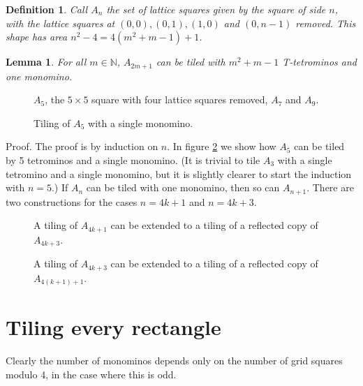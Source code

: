 \documentclass{article}
\theoremstyle{plain}
\newtheorem{lemma}[theorem]{Lemma}
\newtheorem{definition}[theorem]{Definition}
\begin{document}
\begin{definition}
Call $A_n$ the set of lattice squares given by the square of side $n$, with the lattice squares at $(0, 0), (0,1), (1, 0)$ and $(0, n-1)$ removed.
This shape has area $n^2 - 4 = 4(m^2 + m - 1) + 1$.
\end{definition}

\begin{lemma}
For all $m \in \mathbb{N}$, $A_{2m+1}$ can be tiled with $m^2 + m - 1$ T-tetrominos and one monomino.
\end{lemma}

\begin{figure}

\caption{$A_5$, the $5 \times 5$ square with four lattice squares removed, $A_7$ and $A_9$.}
\label{cropped}
\end{figure}

\begin{figure}

\caption{Tiling of $A_5$ with a single monomino.}
\label{five}
\end{figure}

{\sc Proof.}
The proof is by induction on $n$. In figure \ref{five} we show how $A_5$ can be tiled by 5 tetrominos and a single monomino. (It is trivial to tile $A_3$ with a single tetromino and a single monomino, but it is slightly clearer to start the induction with $n=5$.) If $A_n$ can be tiled with one monomino, then so can $A_{n+1}$. There are two constructions for the cases $n=4k+1$ and $n=4k+3$.

\begin{figure}

\caption{A tiling of $A_{4k+1}$ can be extended to a tiling of a reflected copy of $A_{4k+3}$.}
\label{ones}
\end{figure}

\begin{figure}

\caption{A tiling of $A_{4k+3}$ can be extended to a tiling of a reflected copy of $A_{4(k+1)+1}$.}
\label{threes}
\end{figure}

\section{Tiling every rectangle}
Clearly the number of monominos depends only on the number of grid squares modulo 4, in the case where this is odd.
\end{document}
